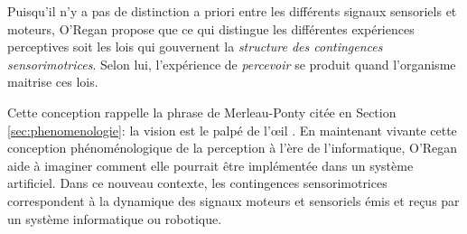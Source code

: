 \begin{quote}
	\cite{oregan_sensorimotor_2001}
\end{quote}


Puisqu'il n'y a pas de distinction a priori entre les différents signaux sensoriels et moteurs, O'Regan propose que ce qui distingue les différentes expériences perceptives soit les lois qui gouvernent la \emph{structure des contingences sensorimotrices}. 
Selon lui, l'expérience de \emph{percevoir} se produit quand l'organisme maitrise ces lois.

Cette conception rappelle la phrase de Merleau-Ponty citée en Section \ref{sec:phenomenologie}: \og la vision est le palpé de l’œil \fg. 
En maintenant vivante cette conception phénoménologique de la perception à l'ère de l'informatique,  O'Regan aide à imaginer comment elle pourrait être implémentée dans un système artificiel. 
Dans ce nouveau contexte, les contingences sensorimotrices correspondent à la dynamique des signaux moteurs et sensoriels émis et reçus par un système informatique ou robotique. 

